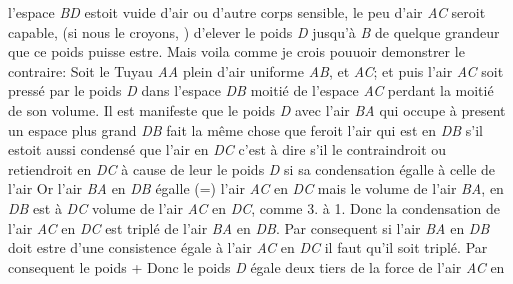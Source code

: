                      l'espace \textit{BD} estoit vuide d'air ou d'autre corps sensible\protect{}, le peu d'air \textit{AC} seroit capable, (si nous le croyons, ) d'elever le poids\protect{} \textit{D} jusqu'\`{a} \textit{B} de quelque grandeur que ce poids\protect{} puisse estre. Mais voila comme je crois pouuoir demonstrer le contraire: Soit le Tuyau \textit{AA} plein d'air uniforme \textit{AB}, et \textit{AC}; et puis l'air \textit{AC} soit press\'{e} par le poids\protect{} \textit{D} dans l'espace \textit{DB}  moiti\'{e} de l'espace \textit{AC} perdant la moiti\'{e} de son volume. Il est manifeste que le poids \textit{D} avec l'air \textit{BA} qui occupe \`{a} present un espace plus grand \textit{DB} fait la m\^{e}me chose  que feroit l'air qui est en \textit{DB} s'il estoit aussi condens\'{e} que l'air en \textit{DC} c'est \`{a} dire s'il le   contraindroit ou retiendroit en \textit{DC} \`{a} cause de leur  le poids \textit{D}  si sa condensation  \'{e}galle \`{a} celle de l'air  Or l'air \textit{BA} en \textit{DB} \'{e}galle (=) l'air \textit{AC} en \textit{DC} mais  le volume de l'air \textit{BA}, en \textit{DB} est \`{a} \textit{DC} volume de l'air \textit{AC} en \textit{DC}, comme 3. \`{a} 1. Donc la condensation de l'air \textit{AC} en \textit{DC} est tripl\'{e} de l'air \textit{BA} en \textit{DB}. Par consequent si l'air \textit{BA} en \textit{DB} doit estre d'une consistence \'{e}gale \`{a} l'air \textit{AC} en \textit{DC} il faut qu'il soit tripl\'{e}. Par consequent le poids  +  Donc le poids \textit{D} \'{e}gale deux tiers de la force de l'air \textit{AC} en 